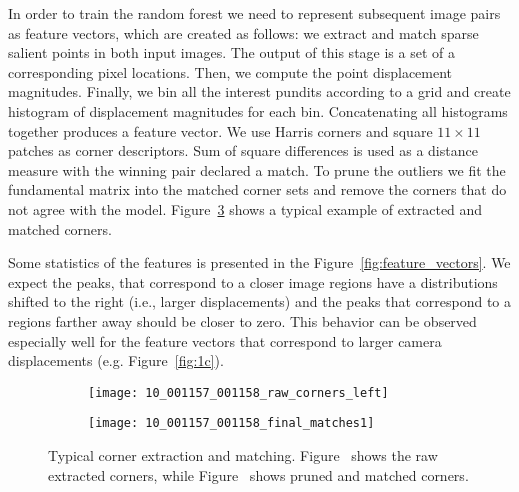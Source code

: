 In order to train the random forest we need to represent subsequent
image pairs as feature vectors, which are created as follows: we
extract and match sparse salient points in both input images.  The
output of this stage is a set of a corresponding pixel locations.
Then, we compute the point displacement magnitudes.  Finally, we bin
all the interest pundits according to a grid and create histogram of
displacement magnitudes for each bin.  Concatenating all histograms
together produces a feature vector. We use Harris corners and square
$11\times 11$ patches as corner descriptors. Sum of square differences
is used as a distance measure with the winning pair declared a match.
To prune the outliers we fit the fundamental matrix into the matched
corner sets and remove the corners that do not agree with the model.
Figure~\ref{fig:ex_corner_and_matching} shows a typical example of
extracted and matched corners.


Some statistics of the features is presented in the
Figure~\ref{fig:feature_vectors}. We expect the peaks, that correspond
to a closer image regions have a distributions shifted to the right
(i.e., larger displacements) and the peaks that correspond to a
regions farther away should be closer to zero.  This behavior can be
observed especially well for the feature vectors that correspond to
larger camera displacements (e.g. Figure~\ref{fig:1c}).

\begin{figure}[!ht]
  \centering
  \begin{subfigure}{.45\linewidth}
    \centering
    \texttt{[image: 10\_001157\_001158\_raw\_corners\_left]}
    \caption{}
    \label{fig:ex_corner_and_matching:corner}
  \end{subfigure}
  \begin{subfigure}{.45\linewidth}
    \texttt{[image: 10\_001157\_001158\_final\_matches1]}
    \caption{}
    \label{fig:ex_corner_and_matching:match}    
  \end{subfigure}
  \caption{Typical corner extraction and
    matching. Figure~ shows the raw
    extracted corners, while Figure~ shows
    pruned and matched corners.}
  \label{fig:ex_corner_and_matching}
\end{figure}

